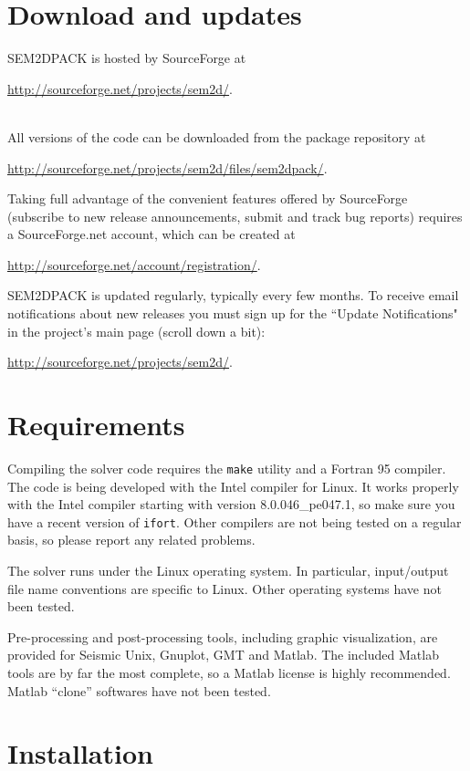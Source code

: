 \section{Download and updates}

SEM2DPACK is hosted by SourceForge at\\
\centerline{\url{http://sourceforge.net/projects/sem2d/}.}\\
All versions of the code can be downloaded from the package repository at\\
\centerline{\url{http://sourceforge.net/projects/sem2d/files/sem2dpack/}.}

Taking full advantage of the convenient features offered by SourceForge 
(subscribe to new release announcements, submit and track bug reports)
requires a SourceForge.net account, which can be created at\\
\centerline{\url{http://sourceforge.net/account/registration/}.}

SEM2DPACK is updated regularly, typically every few months.
To receive email notifications about new releases you must
sign up for the ``Update Notifications" in the project's main page (scroll down a bit):\\
\centerline{\url{http://sourceforge.net/projects/sem2d/}.}

\section{Requirements}

Compiling the solver code requires the \texttt{make} utility
and a Fortran 95 compiler.
The code is being developed with the Intel compiler for Linux.
It works properly with the Intel compiler starting with
version 8.0.046\_pe047.1, so make sure you have a recent version of \texttt{ifort}. 
Other compilers are not being tested on a regular basis,
so please report any related problems.

The solver runs under the Linux operating system. 
In particular, input/output file name conventions are specific to Linux.
Other operating systems have not been tested.

Pre-processing and post-processing tools, including graphic visualization,
are provided for Seismic Unix, Gnuplot, GMT and Matlab.
The included Matlab tools are by far the most complete,
so a Matlab license is highly recommended.
Matlab ``clone'' softwares have not been tested.

\section{Installation}

